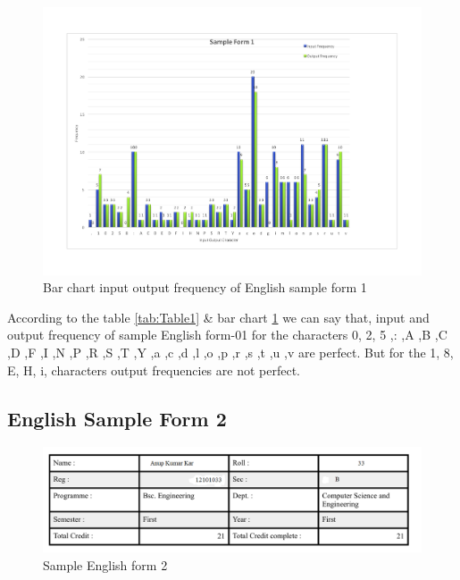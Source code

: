 \begin{figure}[H]
\centering
\includegraphics[width=1\textwidth]{form1.pdf}
\caption {Bar chart input output frequency of English sample form 1}
\label {fig:bar1}
\end{figure}
According to the table \ref{tab:Table1} \& bar chart \ref{fig:bar1} we can say that, input and output frequency of sample English form-01 for the characters 0, 2, 5 ,: ,A ,B ,C ,D ,F ,I ,N ,P ,R ,S ,T ,Y ,a ,c ,d ,l ,o ,p ,r ,s ,t ,u ,v are perfect. But for the 1, 8, E, H, i, characters output frequencies are not perfect. 
\subsection{English Sample Form 2}

\begin{figure}[H]
\centering
\includegraphics[width=1\textwidth]{form2.png}
\caption {Sample English form 2}
\label {fig:form2}
\end{figure}


